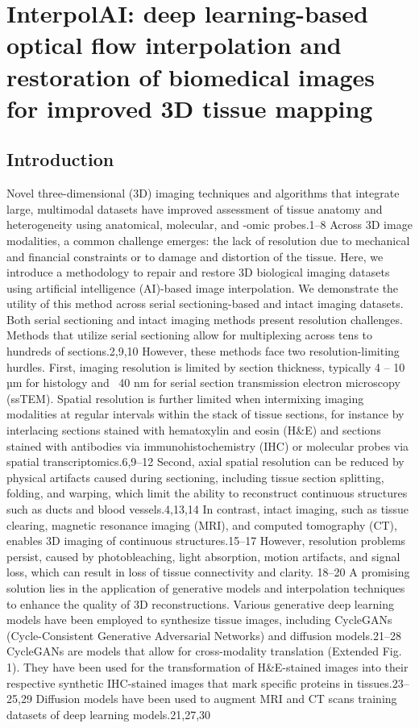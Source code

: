 \chapter{InterpolAI: deep learning-based optical flow interpolation and restoration of biomedical images for improved 3D tissue mapping} \label{chap:chap-6}

\begin{refsection}
    \section{Introduction}
    Novel three-dimensional (3D) imaging techniques and algorithms that integrate large, multimodal datasets have improved assessment of tissue anatomy and heterogeneity using anatomical, molecular, and -omic probes.1–8 Across 3D image modalities, a common challenge emerges: the lack of resolution due to mechanical and financial constraints or to damage and distortion of the tissue. Here, we introduce a methodology to repair and restore 3D biological imaging datasets using artificial intelligence (AI)-based image interpolation. We demonstrate the utility of this method across serial sectioning-based and intact imaging datasets.
    Both serial sectioning and intact imaging methods present resolution challenges. Methods that utilize serial sectioning allow for multiplexing across tens to hundreds of sections.2,9,10 However, these methods face two resolution-limiting hurdles. First, imaging resolution is limited by section thickness, typically 4 – 10 µm for histology and ~40 nm for serial section transmission electron microscopy (ssTEM). Spatial resolution is further limited when intermixing imaging modalities at regular intervals within the stack of tissue sections, for instance by interlacing sections stained with hematoxylin and eosin (H&E) and sections stained with antibodies via immunohistochemistry (IHC) or molecular probes via spatial transcriptomics.6,9–12 Second, axial spatial resolution can be reduced by physical artifacts caused during sectioning, including tissue section splitting, folding, and warping, which limit the ability to reconstruct continuous structures such as ducts and blood vessels.4,13,14 In contrast, intact imaging, such as tissue clearing, magnetic resonance imaging (MRI), and computed tomography (CT), enables 3D imaging of continuous structures.15–17 However, resolution problems persist, caused by photobleaching, light absorption, motion artifacts, and signal loss, which can result in loss of tissue connectivity and clarity. 18–20
    A promising solution lies in the application of generative models and interpolation techniques to enhance the quality of 3D reconstructions. Various generative deep learning models have been employed to synthesize tissue images, including CycleGANs (Cycle-Consistent Generative Adversarial Networks) and diffusion models.21–28 CycleGANs are models that allow for cross-modality translation (Extended Fig. 1). They have been used for the transformation of H&E-stained images into their respective synthetic IHC-stained images that mark specific proteins in tissues.23–25,29  Diffusion models have been used to augment MRI and CT scans training datasets of deep learning models.21,27,30 

\end{refsection}
